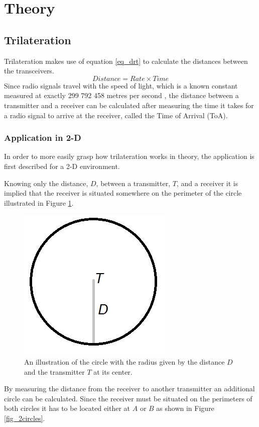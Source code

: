 \section{Theory}

\subsection{Trilateration}
Trilateration makes use of equation \ref{eq_drt} to calculate the distances between the transceivers. 
\begin{equation} \label{eq_drt}
Distance = Rate \times Time
\end{equation}
Since radio signals travel with the speed of light, which is a known constant measured at exactly 299 792 458 metres per second 
\cite{young_university_2004,uzan_natural_2010}, the distance between a transmitter and a receiver can be calculated after measuring the time it takes for a radio signal to arrive at the receiver, called the Time of Arrival (ToA). 

\subsubsection{Application in 2-D} \label{Trilateration2D}
In order to more easily grasp how trilateration works in theory, the application is first described for a 2-D environment.

Knowing only the distance, $D$, between a transmitter, $T$, and a receiver it is implied that the receiver is situated somewhere on the perimeter of the circle illustrated in Figure \ref{fig_circle}.
\begin{figure}[H] 
  \centering
      \includegraphics[height=0.25\textwidth]{img/Circle}
  \caption{An illustration of the circle with the radius given by the distance $D$ and the transmitter $T$ at its center.}
  \label{fig_circle}
\end{figure}

By measuring the distance from the receiver to another transmitter an additional circle can be calculated. Since the receiver must be situated on the perimeters of both circles it has to be located either at $A$ or $B$ as shown in Figure \ref{fig_2circles}.

